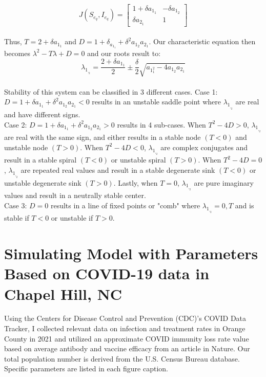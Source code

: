 \documentclass[%
 reprint,
]{revtex4-2}
\begin{document}
\begin{equation}
J(S_e_q,I_e_q) = \begin{bmatrix} 
1+\delta a_1_1 & -\delta a_1_2 \\
\delta a_2_1 & 1 \end{bmatrix}
\end{equation} \\

Thus, $T=2+\delta a_1_1$ and $D=1+\delta_a_1_1 + \delta^2a_1_2 a_2_1$. Our characteristic equation then becomes $\lambda^2 - T\lambda + D = 0$ and our roots result to: \\

\begin{equation}
\lambda_1_,_2 = \frac{2+\delta a_1_1}{2} \pm \frac{\delta}{2}\sqrt{a_1_1^2 - 4a_1_2 a_2_1}
\end{equation} \\

Stability of this system can be classified in 3 different cases. 
Case 1: $D = 1 + \delta a_1_1 + \delta^2 a_1_2 a_2_1 < 0$ results in an unstable saddle point where $\lambda_1_,_2$ are real and have different signs. \\

Case 2: $D = 1 + \delta a_1_1 + \delta^2 a_1_2 a_2_1 > 0$ results in 4 sub-cases. When $T^2-4D>0$, $\lambda_1_,_2$ are real with the same sign, and either results in a stable node $(T<0)$ and unstable node $(T>0)$. When $T^2-4D<0$, $\lambda_1_,_2$ are complex conjugates and result in a stable spiral $(T<0)$ or unstable spiral $(T>0)$. When $T^2-4D=0$, $\lambda_1_,_2$ are repeated real values and result in a stable degenerate sink $(T<0)$ or unstable degenerate sink $(T>0)$. Lastly, when $T=0$, $\lambda_1_,_2$ are pure imaginary values and result in a neutrally stable center. \\

Case 3: $D=0$ results in a line of fixed points or "comb" where $\lambda_1_,_2 = 0,T$ and is stable if $T<0$ or unstable if $T>0$.\\

\section{\label{sec:level1}Simulating Model with Parameters Based on COVID-19 data in Chapel Hill, NC\protect\\}

Using the Centers for Disease Control and Prevention (CDC)'s COVID Data Tracker, I collected relevant data on infection and treatment rates in Orange County in 2021 and utilized an approximate COVID immunity loss rate value based on average antibody and vaccine efficacy from an article in Nature. Our total population number is derived from the U.S. Census Bureau database. Specific parameters are listed in each figure caption. 
\end{document}
